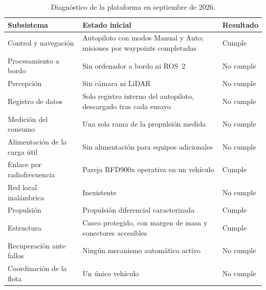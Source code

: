 \begin{table}[!htb]
\centering
\caption{Diagnóstico de la plataforma en septiembre de 2026.}
\label{tab:diagnostico}
\small
\begin{tabularx}{\textwidth}{|>{\raggedright\arraybackslash}p{4.2cm}|>{\raggedright\arraybackslash}X|>{\centering\arraybackslash}p{1.8cm}|}
\hline
\textbf{Subsistema} & \textbf{Estado inicial} & \textbf{Resultado} \\ \hline
Control y navegación & Autopiloto con modos Manual y Auto; misiones por waypoints completadas & Cumple \\ \hline
Procesamiento a bordo & Sin ordenador a bordo ni ROS~2 & No cumple \\ \hline
Percepción & Sin cámara ni LiDAR & No cumple \\ \hline
Registro de datos & Solo registro interno del autopiloto, descargado tras cada ensayo & No cumple \\ \hline
Medición del consumo & Una sola rama de la propulsión medida & No cumple \\ \hline
Alimentación de la carga útil & Sin alimentación para equipos adicionales & No cumple \\ \hline
Enlace por radiofrecuencia & Pareja RFD900x operativa en un vehículo & Cumple \\ \hline
Red local inalámbrica & Inexistente & No cumple \\ \hline
Propulsión & Propulsión diferencial caracterizada & Cumple \\ \hline
Estructura & Casco protegido, con margen de masa y conectores accesibles & Cumple \\ \hline
Recuperación ante fallos & Ningún mecanismo automático activo & No cumple \\ \hline
Coordinación de la flota & Un único vehículo & No cumple \\ \hline
\end{tabularx}
\end{table}